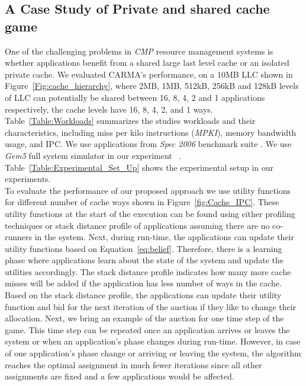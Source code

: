 \subsection{A Case Study of Private and shared cache game}
One of the challenging problems in \textit{CMP} resource management systems is whether applications benefit from a shared large last level cache or an isolated private cache. We evaluated CARMA's performance, on a 10MB LLC shown in Figure~\ref{Fig:cache_hierarchy}, where 2MB, 1MB, 512kB, 256kB and 128kB levels of LLC can potentially be shared between 16, 8, 4, 2 and 1 applications respectively, the cache levels have 16, 8, 4, 2, and 1 ways. Table~\ref{Table:Workloads} summarizes the studies workloads and their characteristics, including miss per kilo instructions (\textit{MPKI}), memory bandwidth usage, and IPC. We use applications from \textit{Spec 2006} benchmark suite \cite{Spec:website}. We use \textit{Gem5} full system simulator in our experiment ~\cite{binkert2011gem5, Gem5:website}. Table~\ref{Table:Experimental_Set_Up} shows the experimental setup in our experiments.\\
\indent To evaluate the performance of our proposed approach we use utility functions for different number of cache ways shown in Figure~\ref{fig:Cache_IPC}. These utility functions at the start of the execution can be found using either profiling techniques or stack distance profile \cite{kim2004fair, suh2002new, suh2004dynamic} of applications assuming there are no co-runners in the system. Next, during run-time, the applications can update their utility functions based on Equation~\ref{eq:belief}. Therefore, there is a learning phase where applications learn about the state of the system and update the utilities accordingly. The stack distance profile indicates how many more cache misses will be added if the application has less number of ways in the cache. Based on the stack distance profile, the applications can update their utility function and bid for the next iteration of the auction if they like to change their allocation. Next, we bring an example of the auction for one time step of the game. This time step can be repeated once an application arrives or leaves the system or when an application's phase changes during run-time. However, in case of one application's phase change or arriving or leaving the system, the algorithm reaches the optimal assignment in much fewer iterations since all other assignments are fixed and a few applications would be affected.\\
